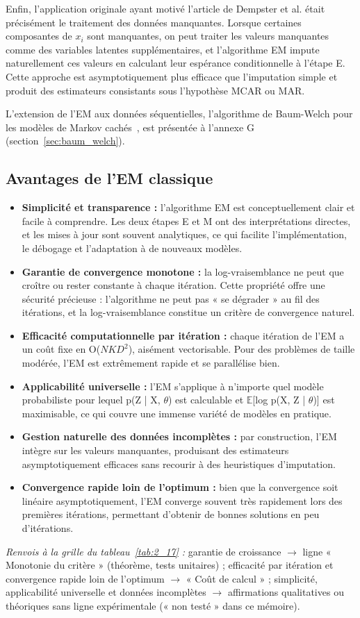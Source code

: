 Enfin, l'application originale ayant motivé l'article de Dempster et al. était précisément le traitement des données manquantes. Lorsque certaines composantes de $x_{i}$ sont manquantes, on peut traiter les valeurs manquantes comme des variables latentes supplémentaires, et l'algorithme EM impute naturellement ces valeurs en calculant leur espérance conditionnelle à l'étape E. Cette approche est asymptotiquement plus efficace que l'imputation simple et produit des estimateurs consistants sous l'hypothèse MCAR ou MAR.

L'extension de l'EM aux données séquentielles, l'algorithme de Baum-Welch pour les modèles de Markov cachés~\cite{baum1970}, est présentée à l'annexe G (section~\ref{sec:baum_welch}).

\subsection{Avantages de l'EM classique}\label{sec:avantages_de_l_em_classique}
\begin{itemize}
\item \textbf{Simplicité et transparence : }l'algorithme EM est conceptuellement clair et facile à comprendre. Les deux étapes E et M ont des interprétations directes, et les mises à jour sont souvent analytiques, ce qui facilite l'implémentation, le débogage et l'adaptation à de nouveaux modèles.
\item \textbf{Garantie de convergence monotone : }la log-vraisemblance ne peut que croître ou rester constante à chaque itération. Cette propriété offre une sécurité précieuse : l'algorithme ne peut pas « se dégrader » au fil des itérations, et la log-vraisemblance constitue un critère de convergence naturel.
\item \textbf{Efficacité computationnelle par itération : }chaque itération de l'EM a un coût fixe en O($NKD^{2}$), aisément vectorisable. Pour des problèmes de taille modérée, l'EM est extrêmement rapide et se parallélise bien.
\item \textbf{Applicabilité universelle : }l'EM s'applique à n'importe quel modèle probabiliste pour lequel p(Z | X, $\theta $) est calculable et $\mathbb{E}$[log p(X, Z | $\theta $)] est maximisable, ce qui couvre une immense variété de modèles en pratique.
\item \textbf{Gestion naturelle des données incomplètes : }par construction, l'EM intègre sur les valeurs manquantes, produisant des estimateurs asymptotiquement efficaces sans recourir à des heuristiques d'imputation.
\item \textbf{Convergence rapide loin de l'optimum : }bien que la convergence soit linéaire asymptotiquement, l'EM converge souvent très rapidement lors des premières itérations, permettant d'obtenir de bonnes solutions en peu d'itérations.
\end{itemize}
\par\noindent\emph{Renvois à la grille du tableau~\ref{tab:2_17} :} garantie de croissance $\to$ ligne « Monotonie du critère » (théorème, tests unitaires) ; efficacité par itération et convergence rapide loin de l'optimum $\to$ « Coût de calcul » ; simplicité, applicabilité universelle et données incomplètes $\to$ affirmations qualitatives ou théoriques sans ligne expérimentale (« non testé » dans ce mémoire).
